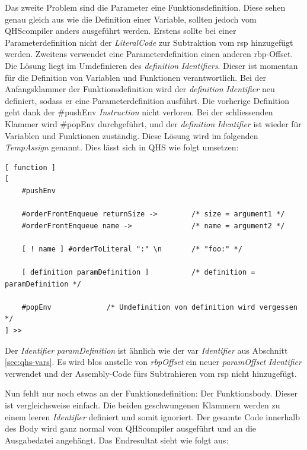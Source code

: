 Das zweite Problem sind die Parameter eine Funktionsdefinition. Diese sehen genau gleich aus wie die Definition einer Variable, sollten jedoch vom QHScompiler anders ausgeführt werden.
Erstens sollte bei einer Parameterdefinition nicht der \textit{LiteralCode} zur Subtraktion vom rsp hinzugefügt werden. Zweitens verwendet eine Parameterdefinition einen anderen rbp-Offset.
Die Lösung liegt im Umdefinieren des \textit{definition} \textit{Identifiers}. Dieser ist momentan für die Definition von Variablen und Funktionen verantwortlich.
Bei der Anfangsklammer der Funktionsdefinition wird der \textit{definition} \textit{Identifier} neu definiert, sodass er eine Parameterdefinition ausführt.
Die vorherige Definition geht dank der {\listingFont\selectfont \#pushEnv} \textit{Instruction} nicht verloren.
Bei der schliessenden Klammer wird {\listingFont\selectfont \#popEnv} durchgeführt, und der \textit{definition} \textit{Identifier} ist wieder für Variablen und Funktionen zuständig.
Diese Lösung wird im folgenden \textit{TempAssign} genannt.
Dies lässt sich in QHS wie folgt umsetzen:

\begin{minipage}{\linewidth}
\begin{lstlisting}[language=QHS, caption=Implementation eines \textit{TempAssigns} für Parameter Definitionen]
[ function ]
[
    #pushEnv

    #orderFrontEnqueue returnSize ->        /* size = argument1 */
    #orderFrontEnqueue name ->              /* name = argument2 */

    [ ! name ] #orderToLiteral ":" \n       /* "foo:" */

    [ definition paramDefinition ]          /* definition = paramDefinition */

    #popEnv             /* Umdefinition von definition wird vergessen */
] >>
\end{lstlisting}
\end{minipage}

Der \textit{Identifier} \textit{paramDefinition} ist ähnlich wie der {\selectListingFont var} \textit{Identifier} aus Abschnitt \ref{sec:qhs-vars}.
Es wird blos anstelle von \textit{rbpOffset} ein neuer \textit{paramOffset} \textit{Identifier} verwendet und der Assembly-Code fürs Subtrahieren vom rsp nicht hinzugefügt.

Nun fehlt nur noch etwas an der Funktionsdefinition: Der Funktionsbody. Dieser ist vergleichsweise einfach. Die beiden geschwungenen Klammern werden zu einem leeren \textit{Identifier} definiert und somit ignoriert.
Der gesamte Code innerhalb des Body wird ganz normal vom QHScompiler ausgeführt und an die Ausgabedatei angehängt. Das Endresultat sieht wie folgt aus:

